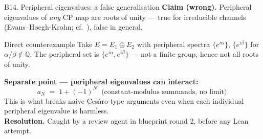 \documentclass[aspectratio=169,10pt]{beamer}
\begin{document}
\begin{frame}{B14. Peripheral eigenvalues: a false generalisation}
    \textbf{Claim (wrong).} Peripheral eigenvalues of \emph{any} CP map are roots of unity --- true for irreducible channels (Evans--H{\o}egh-Krohn; cf.~\cite{Wolf2012Quantum}), false in general.
    \vspace{0.4em}
    \begin{block}{Direct counterexample}
        \footnotesize
        Take $E = E_1 \oplus E_2$ with peripheral spectra $\{e^{i\alpha}\}$, $\{e^{i\beta}\}$ for $\alpha/\beta \notin \mathbb{Q}$. The peripheral set is $\{e^{i\alpha}, e^{i\beta}\}$ --- not a finite group, hence not all roots of unity.
    \end{block}
    \vspace{0.3em}
    \textbf{Separate point --- peripheral eigenvalues can interact:}
    \[
        a_N \;=\; 1 + (-1)^N \;\;\text{(constant-modulus summands, no limit).}
    \]
    This is what breaks naive Ces\`aro-type arguments even when each individual peripheral eigenvalue is harmless.
    \vspace{0.3em}
    \\
    \textbf{Resolution.} Caught by a review agent in blueprint round 2, before any Lean attempt.
\end{frame}
\end{document}
